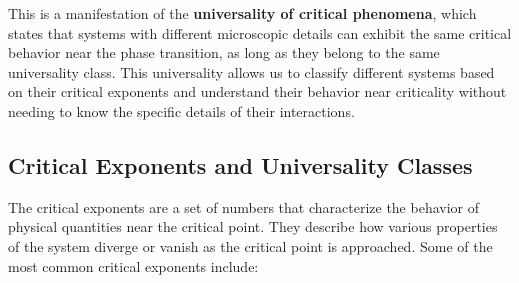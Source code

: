 This is a manifestation of the \textbf{universality of critical phenomena}, which states that systems with different microscopic details can exhibit the same critical behavior near the phase transition, as long as they belong to the same universality class. This universality allows us to classify different systems based on their critical exponents and understand their behavior near criticality without needing to know the specific details of their interactions.

\subsection{Critical Exponents and Universality Classes}

The critical exponents are a set of numbers that characterize the behavior of physical quantities near the critical point. They describe how various properties of the system diverge or vanish as the critical point is approached. Some of the most common critical exponents include:
